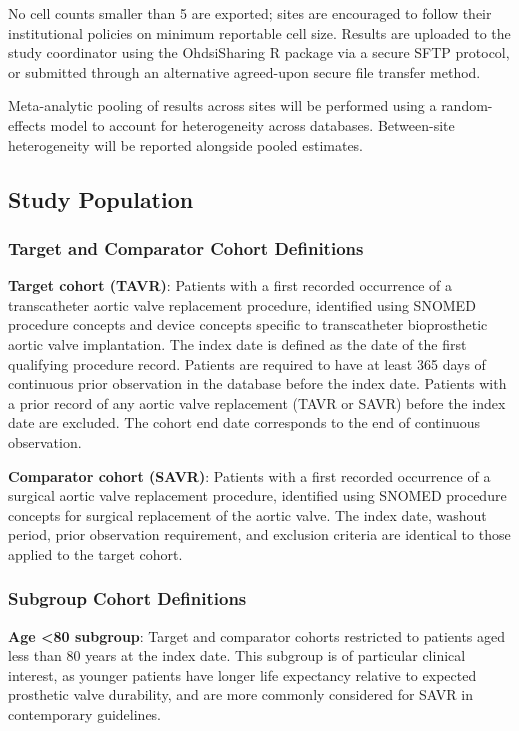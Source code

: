 \documentclass[
  12pt,
]{article}
\begin{document}
No cell counts smaller than 5 are exported; sites are encouraged to
follow their institutional policies on minimum reportable cell size.
Results are uploaded to the study coordinator using the OhdsiSharing R
package via a secure SFTP protocol, or submitted through an alternative
agreed-upon secure file transfer method.

Meta-analytic pooling of results across sites will be performed using a
random-effects model to account for heterogeneity across databases.
Between-site heterogeneity will be reported alongside pooled estimates.

\subsection{Study Population}\label{study-population}

\subsubsection{Target and Comparator Cohort
Definitions}\label{target-and-comparator-cohort-definitions}

\textbf{Target cohort (TAVR)}: Patients with a first recorded occurrence
of a transcatheter aortic valve replacement procedure, identified using
SNOMED procedure concepts and device concepts specific to transcatheter
bioprosthetic aortic valve implantation. The index date is defined as
the date of the first qualifying procedure record. Patients are required
to have at least 365 days of continuous prior observation in the
database before the index date. Patients with a prior record of any
aortic valve replacement (TAVR or SAVR) before the index date are
excluded. The cohort end date corresponds to the end of continuous
observation.

\textbf{Comparator cohort (SAVR)}: Patients with a first recorded
occurrence of a surgical aortic valve replacement procedure, identified
using SNOMED procedure concepts for surgical replacement of the aortic
valve. The index date, washout period, prior observation requirement,
and exclusion criteria are identical to those applied to the target
cohort.

\subsubsection{Subgroup Cohort
Definitions}\label{subgroup-cohort-definitions}

\textbf{Age \textless80 subgroup}: Target and comparator cohorts
restricted to patients aged less than 80 years at the index date. This
subgroup is of particular clinical interest, as younger patients have
longer life expectancy relative to expected prosthetic valve durability,
and are more commonly considered for SAVR in contemporary guidelines.
\end{document}
